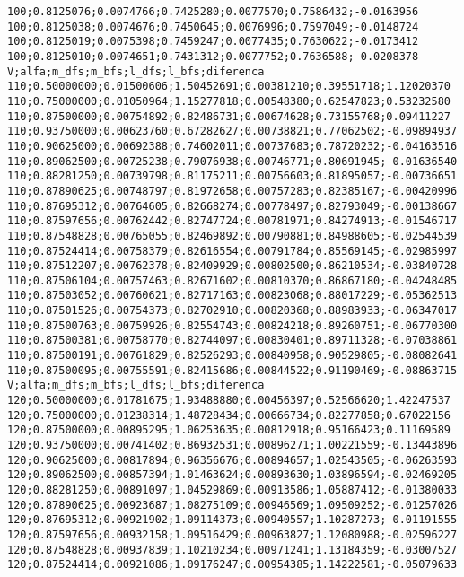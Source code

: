 \documentclass[brazil,times]{abnt}
\begin{document}
{\begin{verbatim}
100;0.8125076;0.0074766;0.7425280;0.0077570;0.7586432;-0.0163956
100;0.8125038;0.0074676;0.7450645;0.0076996;0.7597049;-0.0148724
100;0.8125019;0.0075398;0.7459247;0.0077435;0.7630622;-0.0173412
100;0.8125010;0.0074651;0.7431312;0.0077752;0.7636588;-0.0208378
V;alfa;m_dfs;m_bfs;l_dfs;l_bfs;diferenca
110;0.50000000;0.01500606;1.50452691;0.00381210;0.39551718;1.12020370
110;0.75000000;0.01050964;1.15277818;0.00548380;0.62547823;0.53232580
110;0.87500000;0.00754892;0.82486731;0.00674628;0.73155768;0.09411227
110;0.93750000;0.00623760;0.67282627;0.00738821;0.77062502;-0.09894937
110;0.90625000;0.00692388;0.74602011;0.00737683;0.78720232;-0.04163516
110;0.89062500;0.00725238;0.79076938;0.00746771;0.80691945;-0.01636540
110;0.88281250;0.00739798;0.81175211;0.00756603;0.81895057;-0.00736651
110;0.87890625;0.00748797;0.81972658;0.00757283;0.82385167;-0.00420996
110;0.87695312;0.00764605;0.82668274;0.00778497;0.82793049;-0.00138667
110;0.87597656;0.00762442;0.82747724;0.00781971;0.84274913;-0.01546717
110;0.87548828;0.00765055;0.82469892;0.00790881;0.84988605;-0.02544539
110;0.87524414;0.00758379;0.82616554;0.00791784;0.85569145;-0.02985997
110;0.87512207;0.00762378;0.82409929;0.00802500;0.86210534;-0.03840728
110;0.87506104;0.00757463;0.82671602;0.00810370;0.86867180;-0.04248485
110;0.87503052;0.00760621;0.82717163;0.00823068;0.88017229;-0.05362513
110;0.87501526;0.00754373;0.82702910;0.00820368;0.88983933;-0.06347017
110;0.87500763;0.00759926;0.82554743;0.00824218;0.89260751;-0.06770300
110;0.87500381;0.00758770;0.82744097;0.00830401;0.89711328;-0.07038861
110;0.87500191;0.00761829;0.82526293;0.00840958;0.90529805;-0.08082641
110;0.87500095;0.00755591;0.82415686;0.00844522;0.91190469;-0.08863715
V;alfa;m_dfs;m_bfs;l_dfs;l_bfs;diferenca
120;0.50000000;0.01781675;1.93488880;0.00456397;0.52566620;1.42247537
120;0.75000000;0.01238314;1.48728434;0.00666734;0.82277858;0.67022156
120;0.87500000;0.00895295;1.06253635;0.00812918;0.95166423;0.11169589
120;0.93750000;0.00741402;0.86932531;0.00896271;1.00221559;-0.13443896
120;0.90625000;0.00817894;0.96356676;0.00894657;1.02543505;-0.06263593
120;0.89062500;0.00857394;1.01463624;0.00893630;1.03896594;-0.02469205
120;0.88281250;0.00891097;1.04529869;0.00913586;1.05887412;-0.01380033
120;0.87890625;0.00923687;1.08275109;0.00946569;1.09509252;-0.01257026
120;0.87695312;0.00921902;1.09114373;0.00940557;1.10287273;-0.01191555
120;0.87597656;0.00932158;1.09516429;0.00963827;1.12080988;-0.02596227
120;0.87548828;0.00937839;1.10210234;0.00971241;1.13184359;-0.03007527
120;0.87524414;0.00921086;1.09176247;0.00954385;1.14222581;-0.05079633

\end{verbatim}}
\end{document}
